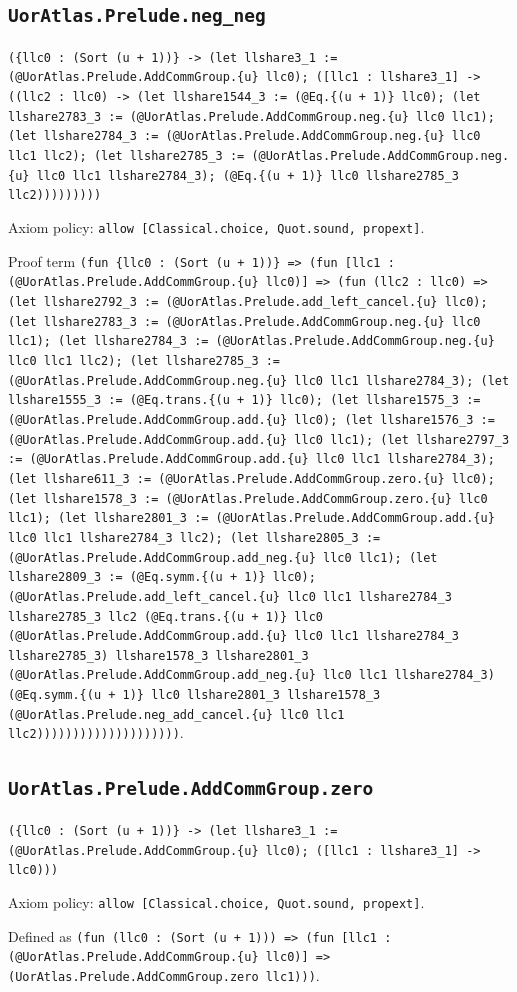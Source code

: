 \documentclass[11pt]{article}
\begin{document}
\subsection*{\texttt{UorAtlas.Prelude.neg\_neg}}
\noindent\texttt{(\{llc0 : (Sort (u + 1))\} -> (let llshare3\_1 := (@UorAtlas.Prelude.AddCommGroup.\{u\} llc0); ([llc1 : llshare3\_1] -> ((llc2 : llc0) -> (let llshare1544\_3 := (@Eq.\{(u + 1)\} llc0); (let llshare2783\_3 := (@UorAtlas.Prelude.AddCommGroup.neg.\{u\} llc0 llc1); (let llshare2784\_3 := (@UorAtlas.Prelude.AddCommGroup.neg.\{u\} llc0 llc1 llc2); (let llshare2785\_3 := (@UorAtlas.Prelude.AddCommGroup.neg.\{u\} llc0 llc1 llshare2784\_3); (@Eq.\{(u + 1)\} llc0 llshare2785\_3 llc2)))))))))}\par
\noindent Axiom policy: \texttt{allow [Classical.choice, Quot.sound, propext]}.\par
\noindent Proof term \texttt{(fun \{llc0 : (Sort (u + 1))\} => (fun [llc1 : (@UorAtlas.Prelude.AddCommGroup.\{u\} llc0)] => (fun (llc2 : llc0) => (let llshare2792\_3 := (@UorAtlas.Prelude.add\_left\_cancel.\{u\} llc0); (let llshare2783\_3 := (@UorAtlas.Prelude.AddCommGroup.neg.\{u\} llc0 llc1); (let llshare2784\_3 := (@UorAtlas.Prelude.AddCommGroup.neg.\{u\} llc0 llc1 llc2); (let llshare2785\_3 := (@UorAtlas.Prelude.AddCommGroup.neg.\{u\} llc0 llc1 llshare2784\_3); (let llshare1555\_3 := (@Eq.trans.\{(u + 1)\} llc0); (let llshare1575\_3 := (@UorAtlas.Prelude.AddCommGroup.add.\{u\} llc0); (let llshare1576\_3 := (@UorAtlas.Prelude.AddCommGroup.add.\{u\} llc0 llc1); (let llshare2797\_3 := (@UorAtlas.Prelude.AddCommGroup.add.\{u\} llc0 llc1 llshare2784\_3); (let llshare611\_3 := (@UorAtlas.Prelude.AddCommGroup.zero.\{u\} llc0); (let llshare1578\_3 := (@UorAtlas.Prelude.AddCommGroup.zero.\{u\} llc0 llc1); (let llshare2801\_3 := (@UorAtlas.Prelude.AddCommGroup.add.\{u\} llc0 llc1 llshare2784\_3 llc2); (let llshare2805\_3 := (@UorAtlas.Prelude.AddCommGroup.add\_neg.\{u\} llc0 llc1); (let llshare2809\_3 := (@Eq.symm.\{(u + 1)\} llc0); (@UorAtlas.Prelude.add\_left\_cancel.\{u\} llc0 llc1 llshare2784\_3 llshare2785\_3 llc2 (@Eq.trans.\{(u + 1)\} llc0 (@UorAtlas.Prelude.AddCommGroup.add.\{u\} llc0 llc1 llshare2784\_3 llshare2785\_3) llshare1578\_3 llshare2801\_3 (@UorAtlas.Prelude.AddCommGroup.add\_neg.\{u\} llc0 llc1 llshare2784\_3) (@Eq.symm.\{(u + 1)\} llc0 llshare2801\_3 llshare1578\_3 (@UorAtlas.Prelude.neg\_add\_cancel.\{u\} llc0 llc1 llc2))))))))))))))))))))}.\par
\subsection*{\texttt{UorAtlas.Prelude.AddCommGroup.zero}}
\noindent\texttt{(\{llc0 : (Sort (u + 1))\} -> (let llshare3\_1 := (@UorAtlas.Prelude.AddCommGroup.\{u\} llc0); ([llc1 : llshare3\_1] -> llc0)))}\par
\noindent Axiom policy: \texttt{allow [Classical.choice, Quot.sound, propext]}.\par
\noindent Defined as \texttt{(fun (llc0 : (Sort (u + 1))) => (fun [llc1 : (@UorAtlas.Prelude.AddCommGroup.\{u\} llc0)] => (UorAtlas.Prelude.AddCommGroup.zero llc1)))}.\par
\end{document}
